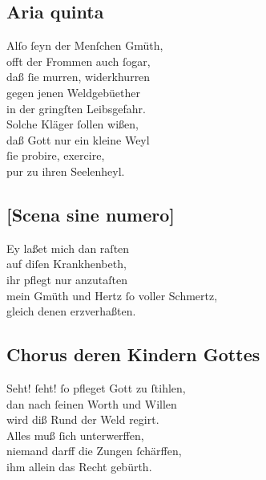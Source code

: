 \documentclass{ees}
\newenvironment{lyrics}[1]{%
  \subsection{#1}\nopagebreak%
  \begin{lyricslist}%
  \let\voice\item%
}{%
  \end{lyricslist}%
}
\begin{document}
\begin{lyrics}{Aria quinta}
  \voice[Eliphas]
  Alſo ſeyn der Menſchen Gmüth,\\
  offt der Frommen auch ſogar,\\
  daß ſie murren, widerkhurren\\
  gegen jenen Weldgebüether\\
  in der gringſten Leibsgefahr.\\[1ex]
  Solche Kläger ſollen wißen,\\
  daß Gott nur ein kleine Weyl\\
  ſie probire, exercire,\\
  pur zu ihren Seelenheyl.
\end{lyrics}

\begin{lyrics}{[Scena sine numero]}
  \voice[Job]
  Ey laßet mich dan raſten\\
  auf diſen Krankhenbeth,\\
  ihr pflegt nur anzutaſten\\
  mein Gmüth und Hertz ſo voller Schmertz,\\
  gleich denen erzverhaßten.
\end{lyrics}

\begin{lyrics}{Chorus deren Kindern Gottes}
  \voice[Die Kinder Gottes]\enlargethispage\baselineskip
  Seht! ſeht! ſo pfleget Gott zu ſtihlen,\\
  dan nach ſeinen Worth und Willen\\
  wird diß Rund der Weld regirt.\\
  Alles muß ſich unterwerffen,\\
  niemand darff die Zungen ſchärffen,\\
  ihm allein das Recht gebürth.
\end{lyrics}

\end{document}
